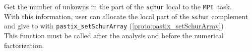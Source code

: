          {Get the number of unkowns in the part of the \texttt{schur}
         local to the \texttt{MPI }task.\\
         With this information, user can allocate the local part of
         the \texttt{schur} complement and give to \pastix{}
         with \texttt{pastix\_setSchurArray}
         (\ref{proto:pastix_setSchurArray})\\
         This function must be called after the analysis and before
         the numerical factorization.}

